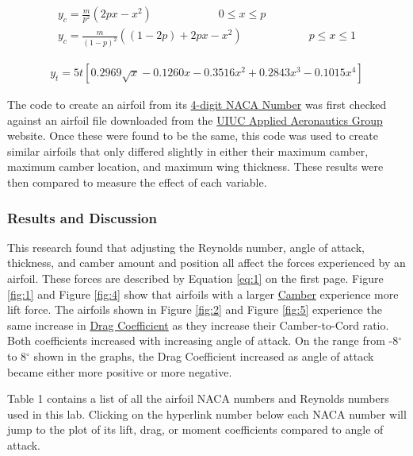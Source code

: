 \documentclass{article}
\begin{document}
\begin{equation} \label{eq:2}
\begin{aligned}
	y_{c} = \frac{m}{p^2} (2 p x - x^2) \qquad \qquad \qquad 0 \leq x \leq p \\
	y_{c} = \frac{m}{(1 - p)^2} ((1 - 2 p) + 2 p x - x^2) \qquad \qquad \qquad p \leq x \leq 1
\end{aligned}
\end{equation}

\begin{equation} \label{eq:3}
\begin{aligned}
	y_{t} = 5 t [ 0.2969 \sqrt{x} - 0.1260 x - 0.3516 x^{2} + 0.2843 x^{3} - 0.1015 x^{4}]
\end{aligned}
\end{equation}

The code to create an airfoil from its \hyperlink{NACA}{4-digit NACA Number} was first checked against an airfoil file downloaded from the \href{https://m-selig.ae.illinois.edu/ads.html}{UIUC Applied Aeronautics Group} website. Once these were found to be the same, this code was used to create similar airfoils that only differed slightly in either their maximum camber, maximum camber location, and maximum wing thickness. These results were then compared to measure the effect of each variable.

\subsubsection*{Results and Discussion}

This research found that adjusting the Reynolds number, angle of attack, thickness, and camber amount and position all affect the forces experienced by an airfoil. These forces are described by Equation \ref{eq:1} on the first page. Figure \ref{fig:1} and Figure \ref{fig:4} show that airfoils with a larger \hyperlink{c}{Camber} experience more lift force. The airfoils shown in Figure \ref{fig:2} and Figure \ref{fig:5} experience the same increase in \hyperlink{CD}{Drag Coefficient} as they increase their Camber-to-Cord ratio. Both coefficients increased with increasing angle of attack. On the range from -8$^{\circ}$ to 8$^{\circ}$ shown in the graphs, the Drag Coefficient increased as angle of attack became either more positive or more negative.\newline

Table 1 contains a list of all the airfoil NACA numbers and Reynolds numbers used in this lab. Clicking on the \color{blue}hyperlink number \color{black} below each NACA number will jump to the plot of its lift, drag, or moment coefficients compared to angle of attack. \newline
\end{document}
